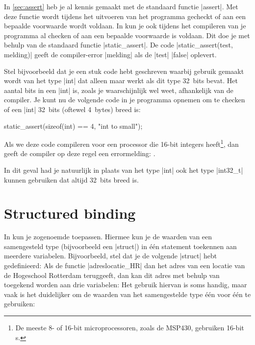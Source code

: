 \begin{cpplstShortInline}
In \cref{sec:assert} heb je al kennis gemaakt met de standaard functie |assert|.
Met deze functie wordt tijdens het uitvoeren van het programma gecheckt of aan een bepaalde voorwaarde wordt voldaan.
In \Cpp{} kun je ook tijdens het compileren van je programma al checken of aan een bepaalde voorwaarde is voldaan.
Dit doe je met behulp van de standaard functie |static_assert|.
De code |static_assert(test, melding)| geeft de compiler-error |melding| als de |test| |false| oplevert.

Stel bijvoorbeeld dat je een stuk code hebt geschreven waarbij gebruik gemaakt wordt van het type |int| dat alleen maar werkt als dit type 32~bits bevat.
Het aantal bits in een |int| is, zoals je waarschijnlijk wel weet, afhankelijk van de compiler. Je kunt nu de volgende code in je programma opnemen om te checken of een |int| 32~bits (oftewel 4~bytes) breed is:

\begin{cpplstfragment}
	static_assert(sizeof(int) == 4, "int to small");	
\end{cpplstfragment}

Als we deze code compileren voor een processor die 16-bit integers heeft\footnote{%
	De meeste 8- of 16-bit microprocessoren, zoals de MSP430, gebruiken 16-bit s.
}, dan geeft de compiler op deze regel een errormelding: .

In dit geval had je natuurlijk in plaats van het type |int| ook het type |int32_t| kunnen gebruiken dat altijd 32~bits breed is.

\section{Structured binding}
\label{sec:structuredbinding}
In \Cpp{} kun je zogenoemde  toepassen.
Hiermee kun je de waarden van een samengesteld type (bijvoorbeeld een |struct|) in één statement toekennen aan meerdere variabelen.
Bijvoorbeeld, stel dat je de volgende |struct| hebt gedefinieerd:
Als de functie |adreslocatie_HR| dan het adres van een locatie van de Hogeschool Rotterdam teruggeeft, dan kan dit adres met behulp van  toegekend worden aan drie variabelen:
Het gebruik hiervan is soms handig, maar vaak is het duidelijker om de waarden van het samengestelde type één voor één te gebruiken:


\end{cpplstShortInline}
